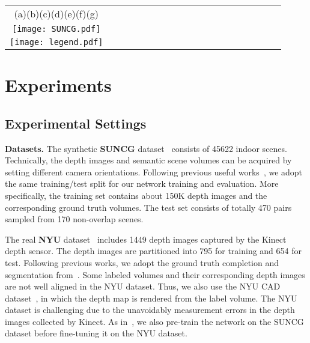 \documentclass[10pt,twocolumn,letterpaper]{article}
\begin{document}
\begin{figure*}
\centering
\resizebox{1\textwidth}{!}
{
\begin{tabular}{@{}c@{}c@{}c@{}c@{}c@{}c@{}c@{}c@{}c@{}c@{}c@{}c@{}c@{}c@{}c@{}c@{}c@{}c@{}c}
(a)\hspace{2.2cm}(b)\hspace{2cm}(c)\hspace{2cm}(d)\hspace{2cm}(e)\hspace{2cm}(f)\hspace{2.2cm}(g)\\
\texttt{[image: SUNCG.pdf]} \\
\texttt{[image: legend.pdf]} \\
\end{tabular}
}
\caption{Completion results with different methods on the SUNCG dataset.
From the left to right: (a) Input Depth; (b) fTSDF Surface; (c) Ground Truth; (d) SSCNet~\cite{song2017semantic}; (e) VVNet~\cite{guo2018view}; (f) ESSCNet~\cite{zhang2018efficient}; (g) Ours.
It can be observed that, our results constantly contain more accurate and detailed structures compared to the baselines.
The figure is best viewed in color with 200\% zooming-in.}
\label{fig:SUNCG}
\vspace{-4mm}
\end{figure*}
\section{Experiments}
\subsection{Experimental Settings}
\textbf{Datasets.}
The synthetic \textbf{SUNCG} dataset~\cite{song2016deep} consists of 45622 indoor scenes.
Technically, the depth images and semantic scene volumes can be acquired by setting different camera orientations.
Following previous useful works~\cite{song2017semantic,garbade2018two,guo2018view}, we adopt the same training/test split for our network training and evaluation.
More specifically, the training set contains about 150K depth images and the corresponding ground truth volumes.
The test set consists of totally 470 pairs sampled from 170 non-overlap scenes.

The real \textbf{NYU} dataset~\cite{silberman2012indoor} includes 1449 depth images captured by the Kinect depth sensor.
The depth images are partitioned into 795 for training and 654 for test.
Following previous works, we adopt the ground truth completion and segmentation from~\cite{guo2015predicting}.
Some labeled volumes and their corresponding depth images are not well aligned in the NYU dataset.
Thus, we also use the NYU CAD dataset~\cite{firman2016structured}, in which the depth map is rendered from the label volume.
The NYU dataset is challenging due to the unavoidably measurement errors in the depth images collected by Kinect.
As in~\cite{song2017semantic,guo2018view,liu2018see}, we also pre-train the network on the SUNCG dataset before fine-tuning it on the NYU dataset.
\end{document}
